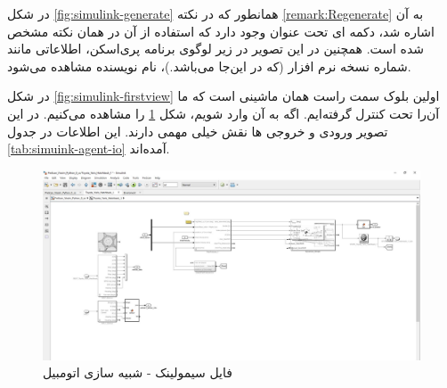 در شکل 
\ref{fig:simulink-generate}
همانطور که در نکته
\ref{remark:Regenerate} 
به آن اشاره شد، دکمه ای تحت عنوان 
وجود دارد که استفاده از آن در همان نکته مشخص شده است. همچنین در این تصویر در زیر لوگوی برنامه پری‌اسکن، اطلاعاتی مانند شماره نسخه نرم افزار (که در این‌جا  می‌باشد.)، نام نویسنده مشاهده می‌شود.

در شکل 
\ref{fig:simulink-firstview}
اولین بلوک سمت راست همان ماشینی است که ما آن‌را تحت کنترل گرفته‌ایم. اگه به آن وارد شویم، شکل 
\ref{fig:simulink-agent}
را مشاهده می‌کنیم.
در این تصویر ورودی و خروجی ها نقش خیلی مهمی دارند. این اطلاعات در جدول
\ref{tab:simuink-agent-io}
آمده‌اند.



\begin{figure}[h!]
	\centering
	\includegraphics[width=1\linewidth]{Figures/simulink/agent}
	\caption{فایل سیمولینک - شبیه سازی اتومبیل}
	\label{fig:simulink-agent}
\end{figure}


